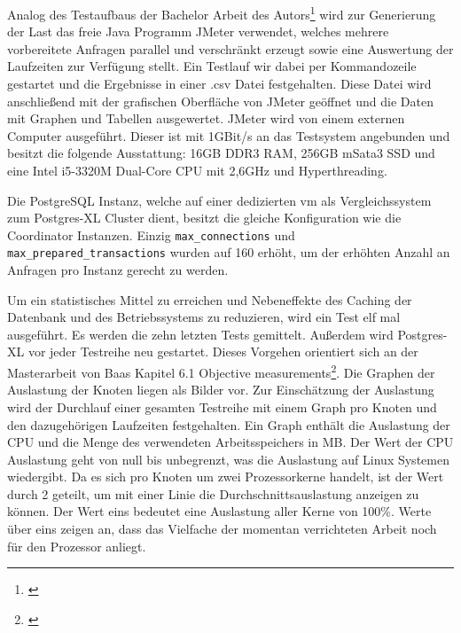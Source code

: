 Analog des Testaufbaus der Bachelor Arbeit des Autors\footnote{\cite{ba:kurt}} wird zur Generierung der Last das freie Java Programm JMeter verwendet, welches mehrere vorbereitete Anfragen parallel und verschränkt erzeugt sowie eine Auswertung der Laufzeiten zur Verfügung stellt.
Ein Testlauf wir dabei per Kommandozeile gestartet und die Ergebnisse in einer .csv Datei festgehalten.
Diese Datei wird anschließend mit der grafischen Oberfläche von JMeter geöffnet und die Daten mit Graphen und Tabellen ausgewertet.
JMeter wird von einem externen Computer ausgeführt.
Dieser ist mit 1GBit/s an das Testsystem angebunden und besitzt die folgende Ausstattung:
16GB DDR3 RAM, 256GB mSata3 SSD und eine Intel i5-3320M Dual-Core CPU mit 2,6GHz und Hyperthreading.

Die PostgreSQL Instanz, welche auf einer dedizierten \Gls{vm} als Vergleichssystem zum Postgres-XL Cluster dient, besitzt die gleiche Konfiguration wie die Coordinator Instanzen.
Einzig \verb+max_connections+ und \verb+max_prepared_transactions+ wurden auf 160 erhöht, um der erhöhten Anzahl an Anfragen pro Instanz  gerecht zu werden.

Um ein statistisches Mittel zu erreichen und Nebeneffekte des Caching der Datenbank und des Betriebssystems zu reduzieren, wird ein Test elf mal ausgeführt.
Es werden die zehn letzten Tests gemittelt.
Außerdem wird Postgres-XL vor jeder Testreihe neu gestartet.
Dieses Vorgehen orientiert sich an der Masterarbeit von Baas Kapitel 6.1 Objective measurements\footnote{\cite[S.51]{ma:neo4j}}.
Die Graphen der Auslastung der Knoten liegen als Bilder vor.
Zur Einschätzung der Auslastung wird der Durchlauf einer gesamten Testreihe mit einem Graph pro Knoten und den dazugehörigen Laufzeiten festgehalten.
Ein Graph enthält die Auslastung der CPU und die Menge des verwendeten Arbeitsspeichers in MB.
Der Wert der CPU Auslastung geht von null bis unbegrenzt, was die Auslastung auf Linux Systemen wiedergibt.
Da es sich pro Knoten um zwei Prozessorkerne handelt, ist der Wert durch 2 geteilt, um mit einer Linie die Durchschnittsauslastung anzeigen zu können.
Der Wert eins bedeutet eine Auslastung aller Kerne von 100\%{}.
Werte über eins zeigen an, dass das Vielfache der momentan verrichteten Arbeit noch für den Prozessor anliegt.

